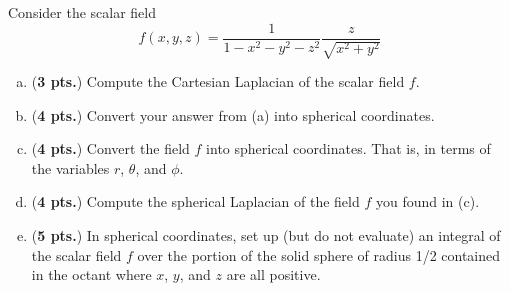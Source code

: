 \documentclass[12pt]{amsbook}
\begin{document}
\newpage
\begin{problem} Consider the scalar field 
\[
f(x,y,z) = \frac{1}{1-x^2-y^2-z^2}\frac{z}{\sqrt{x^2+y^2}}
\] 
    \begin{enumerate}[(a)]
        \item (\textbf{3 pts.}) Compute the Cartesian Laplacian of the scalar field $f$.
                \vspace*{.25cm}
        \item (\textbf{4 pts.}) Convert your answer from (a) into spherical coordinates.
                \vspace*{.25cm}
        \item (\textbf{4 pts.}) Convert the field $f$ into spherical coordinates. That is, in terms of the variables $r$, $\theta$, and $\phi$.
                \vspace*{.25cm}
        \item (\textbf{4 pts.}) Compute the spherical Laplacian of the field $f$ you found in (c).
                \vspace*{.25cm}
        \item (\textbf{5 pts.}) In spherical coordinates, set up (but do not evaluate) an integral of the scalar field $f$ over the portion of the solid sphere of radius 1/2 contained in the octant where $x$, $y$, and $z$ are all positive.
        \vspace*{.25cm}

    \end{enumerate}
\end{problem}
\end{document}
